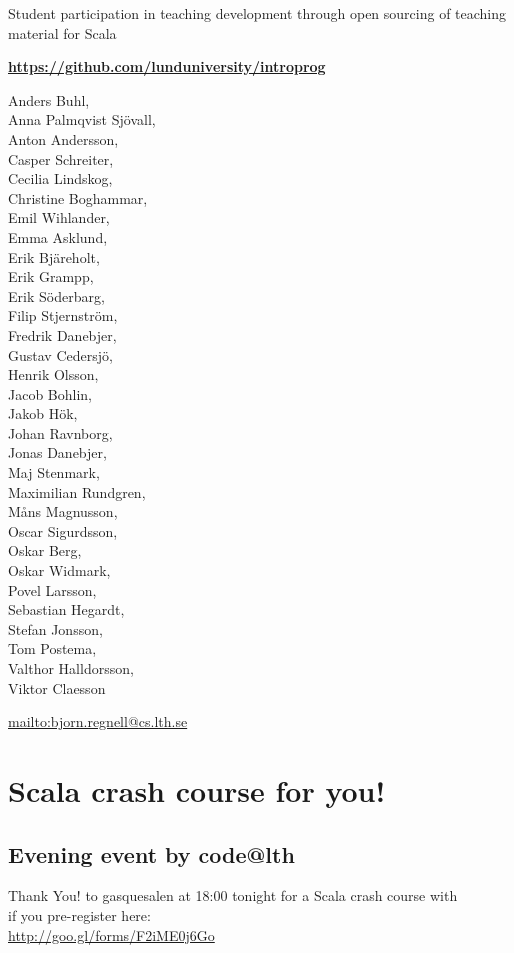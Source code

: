 \documentclass{lecturenotes}
\begin{document}
\begin{Slide}{Student participation in teaching development through open sourcing of teaching material for Scala}

{\large\textbf{\url{https://github.com/lunduniversity/introprog}}}

\begin{multicols}{3}\footnotesize
Anders Buhl, \\Anna Palmqvist Sjövall, \\Anton Andersson, \\Casper Schreiter, \\Cecilia Lindskog, \\Christine Boghammar, \\Emil Wihlander, \\Emma Asklund, \\Erik Bjäreholt, \\Erik Grampp, \\Erik Söderbarg, \\Filip Stjernström, \\Fredrik Danebjer, \\Gustav Cedersjö, \\Henrik Olsson, \\Jacob Bohlin, \\Jakob Hök, \\Johan Ravnborg, \\Jonas Danebjer, \\Maj Stenmark, \\Maximilian Rundgren, \\Måns Magnusson, \\Oscar Sigurdsson, \\Oskar Berg, \\Oskar Widmark, \\Povel Larsson, \\Sebastian Hegardt, \\Stefan Jonsson, \\Tom Postema, \\Valthor Halldorsson, \\Viktor Claesson
\end{multicols}

 {\footnotesize\url{mailto:bjorn.regnell@cs.lth.se}}
\end{Slide}

\section*{Scala crash course for you!}
\subsection*{Evening event by code@lth}

\begin{Slide}{Thank You!}
\Large {} to gasquesalen at 18:00 tonight for a Scala crash course with  \\ \vspace{1em}  if you pre-register here:\\ \vspace{0.5em}  \url{http://goo.gl/forms/F2iME0j6Go}
\end{Slide}
\end{document}
